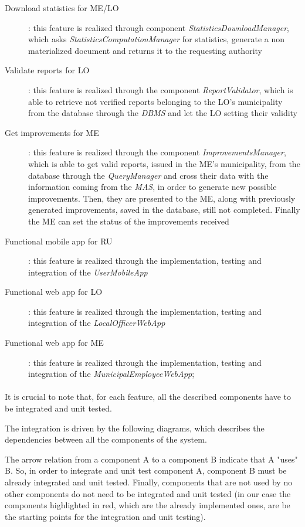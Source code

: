 \begin{description}
				\item [Download statistics for ME/LO]: this feature is realized through component \textit{StatisticsDownloadManager}, which asks \textit{StatisticsComputationManager} for statistics, generate a non materialized document and returns it to the requesting authority
				\item [Validate reports for LO]: this feature is realized through the component \textit{ReportValidator}, which is able to retrieve not verified reports belonging to the LO's municipality from the database through the \textit{DBMS} and let the LO setting their validity
				\item [Get improvements for ME]: this feature is realized through the component \textit{ImprovementsManager}, which is able to get valid reports, issued in the ME's municipality, from the database through the \textit{QueryManager} and cross their data with the information coming from the \textit{MAS}, in order to generate new possible improvements. Then, they are presented to the ME, along with previously generated improvements, saved in the database, still not completed. Finally the ME can set the status of the improvements received
				\item [Functional mobile app for RU]: this feature is realized through the implementation, testing and integration of the \textit{UserMobileApp}
				\item [Functional web app for LO]: this feature is realized through the implementation, testing and integration of the \textit{LocalOfficerWebApp}
				\item [Functional web app for ME]: this feature is realized through the implementation, testing and integration of the \textit{MunicipalEmployeeWebApp};
			\end{description}
		\paragraph{}
			It is crucial to note that, for each feature, all the described components have to be integrated and unit tested. 
			
			The integration is driven by the following diagrams, which describes the dependencies between all the components of the system. 
			
			The arrow relation from a component A to a component B indicate that A "uses" B. So, in order to integrate and unit test component A, component B must be already integrated and unit tested. Finally, components that are not used by no other components do not need to be integrated and unit tested (in our case the components highlighted in red, which are the already implemented ones, are be the starting points for the integration and unit testing).
			
